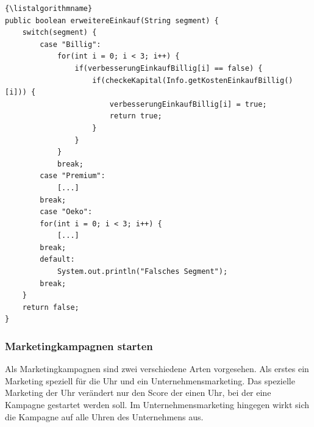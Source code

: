 \lstset{language=Java}
\begin{lstlisting}{\listalgorithmname}
public boolean erweitereEinkauf(String segment) {
	switch(segment) {
		case "Billig":
			for(int i = 0; i < 3; i++) {
				if(verbesserungEinkaufBillig[i] == false) {
					if(checkeKapital(Info.getKostenEinkaufBillig()[i])) {
						verbesserungEinkaufBillig[i] = true;
						return true;
					}
				}
			}
			break;
		case "Premium":
			[...]
		break;
		case "Oeko":
		for(int i = 0; i < 3; i++) {
			[...]
		break;
		default:
			System.out.println("Falsches Segment");
		break;
	}
	return false;
}
\end{lstlisting}

\subsubsection{Marketingkampagnen starten}
Als Marketingkampagnen sind zwei verschiedene Arten vorgesehen. Als erstes ein Marketing speziell für die Uhr und ein Unternehmensmarketing. Das spezielle Marketing der Uhr verändert nur den Score der einen Uhr, bei der eine Kampagne gestartet werden soll. Im Unternehmensmarketing hingegen wirkt sich die Kampagne auf alle Uhren des Unternehmens aus.

